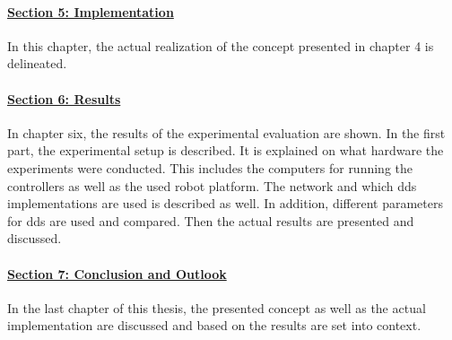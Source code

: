 \paragraph{\hyperref[sec:implementation]{Section 5: Implementation}}
In this chapter, the actual realization of the concept presented in chapter 4 is delineated. 
\paragraph{\hyperref[sec:results]{Section 6: Results}}
In chapter six, the results of the experimental evaluation are shown. In the first part, the experimental setup is described. It is explained on what hardware the experiments were conducted. This includes the computers for running the controllers as well as the used robot platform. The network and which \gls{dds} implementations are used is described as well. In addition, different parameters for \gls{dds} are used and compared. \newline
Then the actual results are presented and discussed.

\paragraph{\hyperref[sec:conclusion_and_outlook]{Section 7: Conclusion and Outlook}}
In the last chapter of this thesis, the presented concept as well as the actual implementation are discussed and based on the results are set into context.

